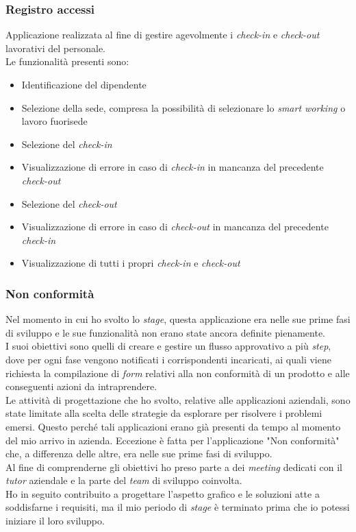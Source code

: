 \subsubsection*{Registro accessi}
Applicazione realizzata al fine di gestire agevolmente i \emph{check-in} e \emph{check-out} lavorativi del personale.\\
Le funzionalità presenti sono: 
\begin{itemize}
    \item Identificazione del dipendente
    \item Selezione della sede, compresa la possibilità di selezionare lo \emph{smart working} o lavoro fuorisede 
    \item Selezione del \emph{check-in} 
    \item Visualizzazione di errore in caso di \emph{check-in} in mancanza del precedente \emph{check-out} 
    \item Selezione del \emph{check-out} 
    \item Visualizzazione di errore in caso di \emph{check-out} in mancanza del precedente \emph{check-in} 
    \item Visualizzazione di tutti i propri \emph{check-in} e \emph{check-out} 
\end{itemize}

\subsubsection*{Non conformità}
Nel momento in cui ho svolto lo \emph{stage}, questa applicazione era nelle sue prime fasi di sviluppo e le sue funzionalità non erano state ancora definite pienamente.\\
I suoi obiettivi sono quelli di creare e gestire un flusso approvativo a più \emph{step}, dove per ogni fase vengono notificati i corrispondenti incaricati, ai quali viene richiesta la compilazione di \emph{form} relativi alla non conformità di un prodotto e alle conseguenti azioni da intraprendere.\\

Le attività di progettazione che ho svolto, relative alle applicazioni aziendali, sono state limitate alla scelta delle strategie da esplorare per risolvere i problemi emersi.
Questo perché tali applicazioni erano già presenti da tempo al momento del mio arrivo in azienda.
Eccezione è fatta per l'applicazione "Non conformità" che, a differenza delle altre, era nelle sue prime fasi di sviluppo.\\
Al fine di comprenderne gli obiettivi ho preso parte a dei \emph{meeting} dedicati con il \emph{\emph{tutor}} aziendale e la parte del \emph{team} di sviluppo coinvolta.\\ 
Ho in seguito contribuito a progettare l'aspetto grafico e le soluzioni atte a soddisfarne i requisiti, ma il mio periodo di \emph{stage} è terminato prima che io potessi iniziare il loro sviluppo.  

